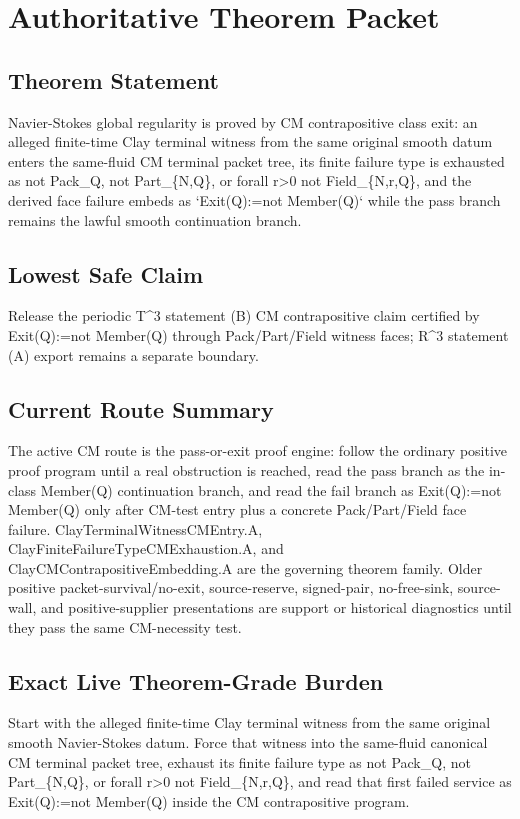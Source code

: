 \section{Authoritative Theorem Packet}

\subsection{Theorem Statement}
Navier-Stokes global regularity is proved by CM contrapositive class exit: an alleged finite-time Clay terminal witness from the same original smooth datum enters the same-fluid CM terminal packet tree, its finite failure type is exhausted as not Pack\_Q, not Part\_\{N,Q\}, or forall r>0 not Field\_\{N,r,Q\}, and the derived face failure embeds as `Exit(Q):=not Member(Q)` while the pass branch remains the lawful smooth continuation branch.

\subsection{Lowest Safe Claim}
Release the periodic T\textasciicircum{}3 statement (B) CM contrapositive claim certified by Exit(Q):=not Member(Q) through Pack/Part/Field witness faces; R\textasciicircum{}3 statement (A) export remains a separate boundary.

\subsection{Current Route Summary}
The active CM route is the pass-or-exit proof engine: follow the ordinary positive proof program until a real obstruction is reached, read the pass branch as the in-class Member(Q) continuation branch, and read the fail branch as Exit(Q):=not Member(Q) only after CM-test entry plus a concrete Pack/Part/Field face failure. ClayTerminalWitnessCMEntry.A, ClayFiniteFailureTypeCMExhaustion.A, and ClayCMContrapositiveEmbedding.A are the governing theorem family. Older positive packet-survival/no-exit, source-reserve, signed-pair, no-free-sink, source-wall, and positive-supplier presentations are support or historical diagnostics until they pass the same CM-necessity test.

\subsection{Exact Live Theorem-Grade Burden}
Start with the alleged finite-time Clay terminal witness from the same original smooth Navier-Stokes datum. Force that witness into the same-fluid canonical CM terminal packet tree, exhaust its finite failure type as not Pack\_Q, not Part\_\{N,Q\}, or forall r>0 not Field\_\{N,r,Q\}, and read that first failed service as Exit(Q):=not Member(Q) inside the CM contrapositive program.

